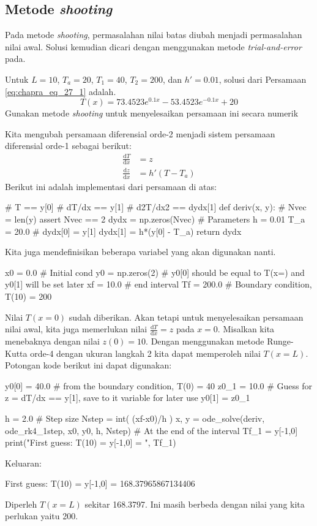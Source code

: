 \subsection{Metode \textit{shooting}}

Pada metode \textit{shooting}, permasalahan nilai batas diubah menjadi permasalahan
nilai awal. Solusi kemudian dicari dengan menggunakan metode \textit{trial-and-error}
pada.

\begin{soal}
Untuk $L=10$, $T_a = 20$, $T_1 = 40$, $T_2 = 200$, dan $h' = 0.01$, solusi
dari Persamaan \eqref{eq:chapra_eq_27_1} adalah.
\begin{equation*}
T(x) = 73.4523 e^{0.1x} - 53.4523 e^{-0.1x} + 20
\end{equation*}
Gunakan metode \textit{shooting} untuk menyelesaikan persamaan ini secara numerik
\end{soal}


Kita mengubah persamaan diferensial orde-2 menjadi sistem persamaan diferensial
orde-1 sebagai berikut:
\begin{align*}
\frac{\mathrm{d}T}{\mathrm{d}x} & = z \\
\frac{\mathrm{d}z}{\mathrm{d}x} & = h'(T - T_a)
\end{align*}
Berikut ini adalah implementasi dari persamaan di atas:
\begin{pythoncode}
# T == y[0]
# dT/dx == y[1]
# d2T/dx2 == dydx[1]
def deriv(x, y):
    #
    Nvec = len(y)
    assert Nvec == 2
    dydx = np.zeros(Nvec)
    # Parameters
    h = 0.01
    T_a = 20.0
    #
    dydx[0] = y[1]
    dydx[1] = h*(y[0] - T_a)
    return dydx
\end{pythoncode}

Kita juga mendefinisikan beberapa variabel yang akan digunakan nanti.
\begin{pythoncode}
x0 = 0.0 # Initial cond
y0 = np.zeros(2) # y0[0] should be equal to T(x=) and y0[1] will be set later
xf = 10.0  # end interval
Tf = 200.0 # Boundary condition, T(10) = 200
\end{pythoncode}


Nilai $T(x=0)$ sudah diberikan. Akan tetapi untuk menyelesaikan persamaan nilai
awal, kita juga memerlukan nilai $\frac{\mathrm{d}T}{\mathrm{d}x} = z$ pada $x=0$.
Misalkan kita menebaknya dengan nilai $z(0) = 10$.
Dengan menggunakan metode Runge-Kutta orde-4 dengan ukuran langkah 2 kita dapat memperoleh
nilai $T(x=L)$. Potongan kode berikut ini dapat digunakan:
\begin{pythoncode}
y0[0] = 40.0 # from the boundary condition, T(0) = 40
z0_1 = 10.0 # Guess for z = dT/dx == y[1], save to it variable for later use
y0[1] = z0_1

h = 2.0 # Step size
Nstep = int( (xf-x0)/h )
x, y = ode_solve(deriv, ode_rk4_1step, x0, y0, h, Nstep)
# At the end of the interval
Tf_1 = y[-1,0]
print("First guess: T(10) = y[-1,0] = ", Tf_1)
\end{pythoncode}
Keluaran:
\begin{textcode}
First guess: T(10) = y[-1,0] =  168.37965867134406
\end{textcode}
Diperleh $T(x=L)$ sekitar 168.3797. Ini masih berbeda dengan nilai yang kita perlukan
yaitu 200.

